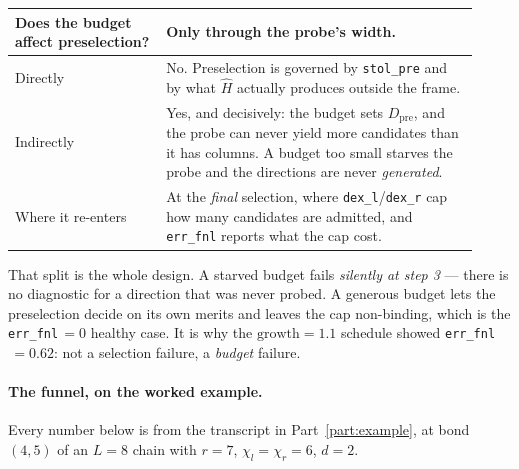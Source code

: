\documentclass[11pt,a4paper]{article}
\newcommand{\Hb}{\hat{H}}
\newcommand{\Dpre}{D_{\mathrm{pre}}}
\newcommand{\code}[1]{\texttt{\small #1}}
\begin{document}
\begin{center}
\small
\begin{tabular}{@{}p{0.30\linewidth}p{0.62\linewidth}@{}}
\toprule
\textbf{Does the budget affect preselection?} & \textbf{Only through the probe's width.} \\
\midrule
Directly & No. Preselection is governed by \code{stol\_pre} and by what $\Hb$ actually
produces outside the frame. \\
Indirectly & Yes, and decisively: the budget sets $\Dpre$, and the probe can never yield more
candidates than it has columns. A budget too small starves the probe and the directions are
never \emph{generated}. \\
Where it re-enters & At the \emph{final} selection, where \code{dex\_l}/\code{dex\_r} cap how
many candidates are admitted, and \code{err\_fnl} reports what the cap cost. \\
\bottomrule
\end{tabular}
\end{center}

\noindent
That split is the whole design. A starved budget fails \emph{silently at step 3} --- there is no
diagnostic for a direction that was never probed. A generous budget lets the preselection decide
on its own merits and leaves the cap non-binding, which is the \code{err\_fnl}$\,=0$ healthy
case. It is why the $\text{growth}=1.1$ schedule showed \code{err\_fnl}$\,=0.62$: not a
selection failure, a \emph{budget} failure.

\paragraph{The funnel, on the worked example.} Every number below is from the transcript in
Part~\ref{part:example}, at bond $(4,5)$ of an $L=8$ chain with $r=7$, $\chi_l=\chi_r=6$, $d=2$.
\end{document}

